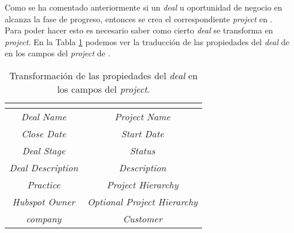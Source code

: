 Como se ha comentado anteriormente si un \textit{deal} u oportunidad de negocio en \hs{} alcanza la fase de progreso, entonces se crea el correspondiente \textit{project} en \wday{}.\\

Para poder hacer esto es necesario saber como cierto \textit{deal} se transforma en \textit{project}. 
En la Tabla \ref{tab:mapping} podemos ver la traducción de las propiedades del \textit{deal} de \hs{} en los campos del \textit{project} de \wday{}.\\


\begin{table}[H]
\centering
\begin{tabular}{|c|c|}
  \hline
  \textbf{\hs{}} & \textbf{\wday{}} \\
  \hline
  \textit{Deal Name} & \textit{Project Name} \\
  \textit{Close Date} & \textit{Start Date} \\
  \textit{Deal Stage} & \textit{Status} \\
  \textit{Deal Description} & \textit{Description} \\
  \textit{Practice} & \textit{Project Hierarchy} \\
  \textit{Hubspot Owner} & \textit{Optional Project Hierarchy} \\
  \textit{company} & \textit{Customer} \\
  \hline
\end{tabular}
	\caption{Transformación de las propiedades del \textit{deal} en los campos del \textit{project}.}
	\label{tab:mapping}
\end{table}

